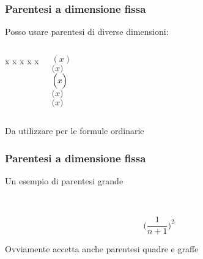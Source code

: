 \documentclass[svgnames,%
	ucs,%
	pdftex]{guitbeamer}
\begin{document}
\begin{frame}
  \frametitle{Parentesi a dimensione fissa}
	Posso usare parentesi di diverse dimensioni:
  \begin{columns}
	\begin{LaTeXcode}
		\LCmd[]{(} x \LCmd[]{)}\n
		 x \vspace{1.1ex}\n
		 x \vspace{2.2ex}\n
		 x \vspace{3ex}\n
		 x \n
	\end{LaTeXcode}
	\begin{LaTeXoutput}
		$( x )$\\
		$\bigl( x\bigr)$\\
		$\Bigl( x \Bigr) $\\
		$\biggr( x \biggr) $\\
		$\Biggr( x \Biggr)$
	\end{LaTeXoutput}
  \end{columns}
  \bigskip
	Da utilizzare per le formule ordinarie
\end{frame}
\begin{frame}
  \frametitle{Parentesi a dimensione fissa}
	Un esempio di parentesi grande
	\begin{LaTeXcode}
		\\[\n
		 \hspace*{5ex}\alert{\\Biggl(}\\frac\{1\}\{n+1\}\alert{\\Biggr)}\textasciicircum 2\n
		\\]
	\end{LaTeXcode}
	\begin{LaTeXoutput}
		\[
			\Biggl(\frac{1}{n+1}\Biggr)^2
		\]
	\end{LaTeXoutput}
	Ovviamente  accetta anche parentesi quadre e graffe
\end{frame}
\end{document}
